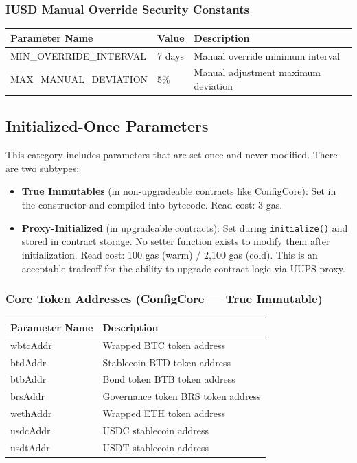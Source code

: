 \documentclass{article}
\begin{document}
\subsubsection{IUSD Manual Override Security Constants}

\begin{center}
\begin{longtable}{p{5.5cm}p{3.5cm}p{5cm}}
\toprule
Parameter Name & Value & Description \\
\midrule
\endhead
MIN\_OVERRIDE\_INTERVAL & 7 days & Manual override minimum interval \\
MAX\_MANUAL\_DEVIATION & 5\% & Manual adjustment maximum deviation \\
\bottomrule
\end{longtable}
\end{center}

\subsection{Initialized-Once Parameters}

This category includes parameters that are set once and never modified. There are two subtypes:

\begin{itemize}
  \item \textbf{True Immutables} (in non-upgradeable contracts like ConfigCore): Set in the constructor and compiled into bytecode. Read cost: 3 gas.
  \item \textbf{Proxy-Initialized} (in upgradeable contracts): Set during \texttt{initialize()} and stored in contract storage. No setter function exists to modify them after initialization. Read cost: 100 gas (warm) / 2,100 gas (cold). This is an acceptable tradeoff for the ability to upgrade contract logic via UUPS proxy.
\end{itemize}

\subsubsection{Core Token Addresses (ConfigCore --- True Immutable)}

\begin{center}
\begin{longtable}{p{4cm}p{10cm}}
\toprule
Parameter Name & Description \\
\midrule
\endhead
wbtcAddr & Wrapped BTC token address \\
btdAddr & Stablecoin BTD token address \\
btbAddr & Bond token BTB token address \\
brsAddr & Governance token BRS token address \\
wethAddr & Wrapped ETH token address \\
usdcAddr & USDC stablecoin address \\
usdtAddr & USDT stablecoin address \\
\bottomrule
\end{longtable}
\end{center}
\end{document}
